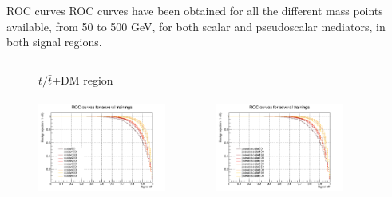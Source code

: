 \documentclass[8pt]{beamer}
\begin{document}
\begin{frame}{ROC curves}
\justifying
ROC curves have been obtained for all the different mass points available, from 50 to 500 GeV, for both scalar and pseudoscalar mediators, in both signal regions. \vfill
\vspace{-5pt}

\begin{figure}[htbp]
\centering
\begin{columns}
\begin{column}{1.09\textwidth}
\begin{block}{\centering $t/\bar t$+DM region}\end{block} \vspace{10pt}
\end{column}
\end{columns} \vspace{-16pt}

\begin{columns}
\begin{column}[b]{.49\textwidth}
\begin{center}
\includegraphics[width=4.2cm, height=3.2cm]{figs/groupedROC_scalar_ST.png}
\end{center}
\end{column} \hfill
\begin{column}[b]{.49\textwidth}
\begin{center}
\includegraphics[width=4.2cm, height=3.2cm]{figs/groupedROC_pseudo_ST.png}
\end{center}
\end{column} \hfill
\end{columns} \vfill
\vspace{-5pt}


\end{figure}
\end{frame}
\end{document}
